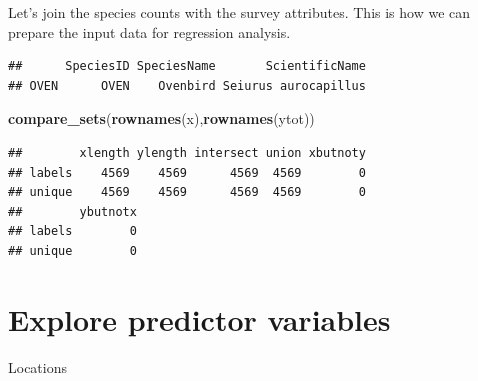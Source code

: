 \documentclass[12pt,]{scrbook}
\newenvironment{Shaded}{\begin{snugshade}}{\end{snugshade}}
\newcommand{\CommentTok}[1]{\textcolor[rgb]{0.56,0.35,0.01}{\textit{#1}}}
\newcommand{\KeywordTok}[1]{\textcolor[rgb]{0.13,0.29,0.53}{\textbf{#1}}}
\newcommand{\NormalTok}[1]{#1}
\newcommand{\OperatorTok}[1]{\textcolor[rgb]{0.81,0.36,0.00}{\textbf{#1}}}
\newcommand{\StringTok}[1]{\textcolor[rgb]{0.31,0.60,0.02}{#1}}
\begin{document}
Let's join the species counts with the survey attributes. This is how we can prepare the
input data for regression analysis.

\begin{Shaded}
\end{Shaded}

\begin{verbatim}
##      SpeciesID SpeciesName       ScientificName
## OVEN      OVEN    Ovenbird Seiurus aurocapillus
\end{verbatim}

\begin{Shaded}
\begin{Highlighting}[]
\KeywordTok{compare_sets}\NormalTok{(}\KeywordTok{rownames}\NormalTok{(x),}\KeywordTok{rownames}\NormalTok{(ytot))}
\end{Highlighting}
\end{Shaded}

\begin{verbatim}
##        xlength ylength intersect union xbutnoty
## labels    4569    4569      4569  4569        0
## unique    4569    4569      4569  4569        0
##        ybutnotx
## labels        0
## unique        0
\end{verbatim}

\begin{Shaded}
\end{Shaded}

\hypertarget{explore-predictor-variables}{%
\section{Explore predictor variables}\label{explore-predictor-variables}}

Locations
\end{document}
